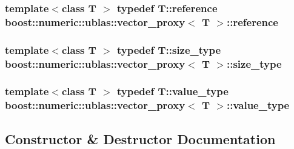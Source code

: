 \subsubsection[{\texorpdfstring{reference}{reference}}]{\setlength{\rightskip}{0pt plus 5cm}template$<$class T $>$ typedef T\+::reference {\bf boost\+::numeric\+::ublas\+::vector\+\_\+proxy}$<$ T $>$\+::{\bf reference}}\hypertarget{classboost_1_1numeric_1_1ublas_1_1vector__proxy_a71ce5967fa951495f9a201a6b2f17e88}{}\label{classboost_1_1numeric_1_1ublas_1_1vector__proxy_a71ce5967fa951495f9a201a6b2f17e88}
\subsubsection[{\texorpdfstring{size\+\_\+type}{size_type}}]{\setlength{\rightskip}{0pt plus 5cm}template$<$class T $>$ typedef T\+::size\+\_\+type {\bf boost\+::numeric\+::ublas\+::vector\+\_\+proxy}$<$ T $>$\+::{\bf size\+\_\+type}}\hypertarget{classboost_1_1numeric_1_1ublas_1_1vector__proxy_a4ea16933b64c4075bcdee2298ab1b11a}{}\label{classboost_1_1numeric_1_1ublas_1_1vector__proxy_a4ea16933b64c4075bcdee2298ab1b11a}
\subsubsection[{\texorpdfstring{value\+\_\+type}{value_type}}]{\setlength{\rightskip}{0pt plus 5cm}template$<$class T $>$ typedef T\+::value\+\_\+type {\bf boost\+::numeric\+::ublas\+::vector\+\_\+proxy}$<$ T $>$\+::{\bf value\+\_\+type}}\hypertarget{classboost_1_1numeric_1_1ublas_1_1vector__proxy_a61bef8c6490e69f94095186b0b1409e0}{}\label{classboost_1_1numeric_1_1ublas_1_1vector__proxy_a61bef8c6490e69f94095186b0b1409e0}


\subsection{Constructor \& Destructor Documentation}
